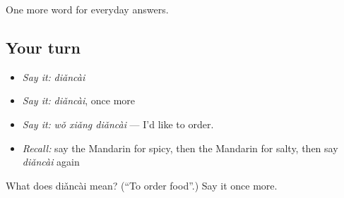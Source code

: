 \begin{grammarlens}[title={What you've built}]
One more word for everyday answers.
\end{grammarlens}

\subsection*{Your turn}
\begin{itemize}
\raggedright
  \item \emph{Say it:} \emph{diǎncài}
  \item \emph{Say it:} \emph{diǎncài}, once more
  \item \emph{Say it:} \emph{wǒ xiǎng diǎncài} — I'd like to order.
  \item \emph{Recall:} say the Mandarin for spicy, then the Mandarin for salty, then say \emph{diǎncài} again
\end{itemize}

\begin{tcolorbox}[breakable,colback=teal!4,colframe=teal!35!black,title={Before you move on}]
What does diǎncài mean? (\textquotedblleft{}To order food\textquotedblright{}.) Say it once more.
\end{tcolorbox}
